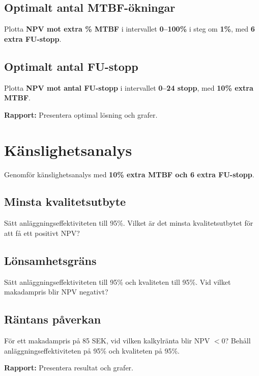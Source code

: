 \documentclass[a4paper,12pt]{exam}
\begin{document}
\subsection{Optimalt antal MTBF-ökningar}
Plotta \textbf{NPV mot extra \% MTBF} i intervallet \textbf{0–100\%} i steg om \textbf{1\%}, med \textbf{6 extra FU-stopp}.

\subsection{Optimalt antal FU-stopp}
Plotta \textbf{NPV mot antal FU-stopp} i intervallet \textbf{0–24 stopp}, med \textbf{10\% extra MTBF}.

\textbf{Rapport:} Presentera optimal lösning och grafer.

\section{Känslighetsanalys}
Genomför känslighetsanalys med \textbf{10\% extra MTBF och 6 extra FU-stopp}.

\subsection{Minsta kvalitetsutbyte}
Sätt anläggningseffektiviteten till 95\%. Vilket är det minsta kvalitetsutbytet för att få ett positivt NPV?

\subsection{Lönsamhetsgräns}
Sätt anläggningseffektiviteten till 95\% och kvaliteten till 95\%. Vid vilket makadampris blir NPV negativt?

\subsection{Räntans påverkan}
För ett makadampris på 85 SEK, vid vilken kalkylränta blir NPV $<0$? Behåll anläggningseffektiviteten på 95\% och kvaliteten på 95\%.

\textbf{Rapport:} Presentera resultat och grafer.
\end{document}
